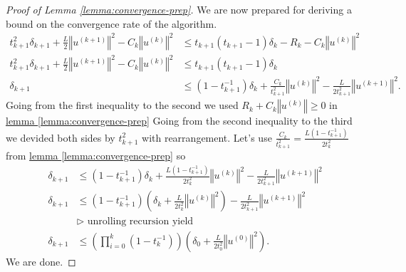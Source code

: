 \begin{proof}[Proof of Lemma \ref*{lemma:convergence-prep}]
        We are now prepared for deriving a bound on the convergence rate of the algorithm. 
        \begin{align*}
            t_{k + 1}^2\delta_{k + 1}  + 
            \frac{L}{2}\left\Vert
                u^{(k + 1)}
            \right\Vert^2 
            - 
            C_k
            \left\Vert
                u^{(k)}
            \right\Vert^2
            &\le
            t_{k + 1}(t_{k + 1} - 1)\delta_k - R_k
            -
            C_k
            \left\Vert
                u^{(k)}
            \right\Vert^2
            \\
            t_{k + 1}^2\delta_{k + 1} + \frac{L}{2}\left\Vert
                u^{(k + 1)}
            \right\Vert^2 
            - C_k
            \left\Vert
                u^{(k)}
            \right\Vert^2
            & \le 
            t_{k + 1}(t_{k + 1} - 1)\delta_k
            \\
            \delta_{k + 1}
            &\le 
            (1 - t_{k + 1}^{-1}) \delta_k + \frac{C_k}{t_{k + 1}^{2}}\left\Vert
                u^{(k)}
            \right\Vert^2 -
            \frac{L}{2t^2_{k + 1}}\left\Vert
                u^{(k + 1)}
            \right\Vert^2. 
        \end{align*}
        Going from the first inequality to the second we used $R_k + C_k\left\Vert u^{(k)}\right\Vert\ge 0$ in \hyperref[lemma:convergence-prep]{lemma \ref*{lemma:convergence-prep}}
        Going from the second inequality to the third we devided both sides by $t_{k + 1}^2$ with rearrangement. 
        Let's use  $\frac{C_k}{t_{k + 1}^2} = \frac{L(1 - t^{-1}_{k + 1})}{2t_{k}^2}$ from \hyperref[lemma:convergence-prep]{lemma \ref*{lemma:convergence-prep}} so
        \begin{align*}
            \delta_{k + 1} &\le 
            (1 - t_{k + 1}^{-1})\delta_k + 
            \frac{L(1 - t_{k + 1}^{-1})}{2t_{k}^2} \left\Vert
                u^{(k)}
            \right\Vert^2 - \frac{L}{2t_{k + 1}^2}\left\Vert u^{(k + 1)} \right\Vert^2
            \\
            \delta_{k + 1} &\le 
            (1 - t_{k + 1}^{-1})\left(
                \delta_k + \frac{L}{2t_{k}^2}\left\Vert
                    u^{(k)}
                \right\Vert^2
            \right) 
            - \frac{L}{2t_{k + 1}^2}\left\Vert u^{(k + 1)}\right\Vert^2
            \\
            & \triangleright \text{ unrolling recursion yield }
            \\
            \delta_{k + 1}
            &\le 
            \left(
                \prod_{i = 0}^{k} \left(
                    1 - t_k^{-1}
                \right)
            \right)\left(
                \delta_0 + \frac{L}{2t_0^2}\left\Vert
                    u^{(0)}
                \right\Vert^2
            \right). 
        \end{align*}
        We are done. 
    \end{proof}

